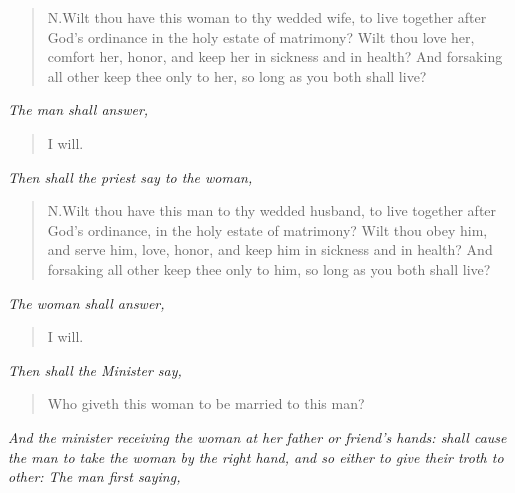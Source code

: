 \documentclass[
]{book}
\begin{document}
\begin{quote}
N.Wilt thou have this woman to thy wedded wife, to live together after God's ordinance in the holy estate of matrimony? Wilt thou love her, comfort her, honor, and keep her in sickness and in health? And forsaking all other keep thee only to her, so long as you both shall live?
\end{quote}

\begin{center}
\emph{The man shall answer,}

\end{center}

\begin{quote}
I will.
\end{quote}

\begin{center}
\emph{Then shall the priest say to the woman,}

\end{center}

\begin{quote}
N.Wilt thou have this man to thy wedded husband, to live together after God's ordinance, in the holy estate of matrimony? Wilt thou obey him, and serve him, love, honor, and keep him in sickness and in health? And forsaking all other keep thee only to him, so long as you both shall live?
\end{quote}

\begin{center}
\emph{The woman shall answer,}

\end{center}

\begin{quote}
I will.
\end{quote}

\begin{center}
\emph{Then shall the Minister say,}

\end{center}

\begin{quote}
Who giveth this woman to be married to this man?
\end{quote}

\begin{center}
\emph{And the minister receiving the woman at her father or friend's hands: shall cause the man to take the woman by the right hand, and so either to give their troth to other: The man first saying,}

\end{center}
\end{document}
